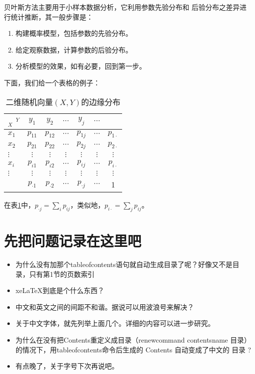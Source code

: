 贝叶斯方法\cite{Gelman}主要用于小样本数据分析，它利用参数先验分布和
后验分布之差异进行统计推断，其一般步骤是：
\begin{enumerate}
  \item 构建概率模型，包括参数的先验分布。
  \item 给定观察数据，计算参数的后验分布。
  \item 分析模型的效果，如有必要，回到第一步。
\end{enumerate}
下面，我们给一个表格的例子：
\begin{center}
\begin{table}[!h]     %
\centering
\caption{二维随机向量$(X,Y)$的边缘分布}
\begin{tabular}{l|ccccc|c}
  $_X$\hspace{3mm} $^Y$&$y_1$&$y_2$&$\cdots$&$y_j$&$\cdots$\\
\hline
$x_1$   &$p_{11}$&$p_{12}$&$\cdots$&$p_{1j}$&$\cdots$&$p_{1\cdot}$\\
$x_2$   &$p_{21}$&$p_{22}$&$\cdots$&$p_{2j}$&$\cdots$&$p_{2\cdot}$\\
$\vdots$&$\vdots$&$\vdots$&$\vdots$&$\vdots$&$\vdots$&$\vdots$ \\
$x_i$   &$p_{i1}$&$p_{i2}$&$\cdots$&$p_{ij}$&$\cdots$&$p_{i\cdot}$\\
$\vdots$&$\vdots$&$\vdots$&$\vdots$&$\vdots$&$\vdots$&$\vdots$ \\
\hline
   &$p_{\cdot 1}$&$p_{\cdot 2}$&$\cdots$&$p_{\cdot j}$&$\cdots$&1
\label{marginal distribution}
\end{tabular}
\end{table}
\end{center}
在表\ref{marginal distribution}中，$p_{\cdot j}=\sum\limits_i p_{ij}$，类似地，$ p_{i\cdot}=\sum\limits_j p_{ij}$。

\section{先把问题记录在这里吧}
\begin{itemize}
\item 为什么没有加那个tableofcontents语句就自动生成目录了呢？好像又不是目录，只有第1节的页数索引
\item xe\LaTeX{}到底是个什么东西？
\item 中文和英文之间的间距不和谐。据说可以用波浪号来解决？
\item 关于中文字体，就先列举上面几个。详细的内容可以进一步研究。
\item 为什么在没有把Contents重定义成目录（renewcommand contentsname 目录）的情况下，用tableofcontents命令后生成的 Contents 自动变成了中文的 目录 ?
\item 有点晚了，关于字号下次再说吧。
\end{itemize}

